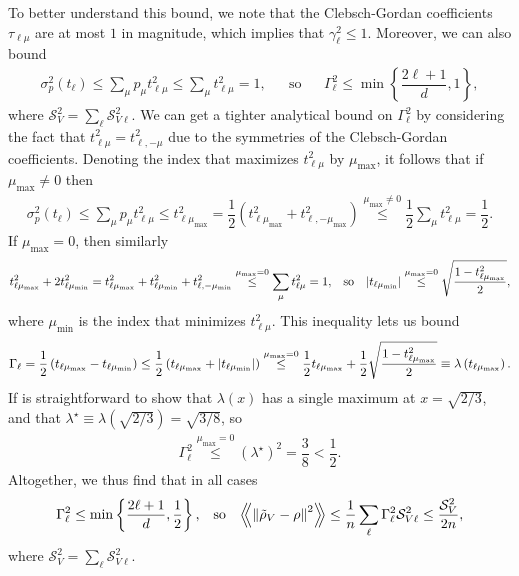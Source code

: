 \documentclass[notitlepage,twocolumn]{revtex4-2}
\renewcommand{\t}{\text} %
\newcommand{\f}[2]{\dfrac{#1}{#2}} %
\newcommand{\p}[1]{\left(#1\right)} %
\renewcommand{\Set}[1]{\left\{#1\right\}} %
\newcommand{\Bbk}[1]
{\left\langle\!\!\left\langle #1 \right\rangle\!\!\right\rangle}
\renewcommand{\S}{\mathcal{S}}
\begin{document}
To better understand this bound, we note that the Clebsch-Gordan coefficients $\tau_{\ell\mu}$ are at most $1$ in magnitude, which implies that $\gamma_\ell^2\le 1$.
Moreover, we can also bound
\begin{align}
  \sigma_p^2\p{t_\ell} \le \sum_\mu p_\mu t_{\ell\mu}^2
  \le \sum_\mu t_{\ell\mu}^2 = 1,
  &&
  \t{so}
  &&
  \Gamma_\ell^2 \le \min\Set{\f{2\ell+1}{d}, 1},
\end{align}
where $\S_V^2=\sum_\ell\S_{V\ell}^2$.
We can get a tighter analytical bound on $\Gamma_\ell^2$ by considering the fact that $t_{\ell\mu}^2 = t_{\ell,-\mu}^2$ due to the symmetries of the Clebsch-Gordan coefficients.
Denoting the index that maximizes $t_{\ell\mu}^2$ by $\mu_{\t{max}}$, it follows that if $\mu_{\t{max}}\ne0$ then
\begin{align}
  \sigma_p^2\p{t_\ell} \le \sum_\mu p_\mu t_{\ell\mu}^2
  \le t_{\ell\mu_{\t{max}}}^2
  = \f12 \p{t_{\ell\mu_{\t{max}}}^2 + t_{\ell,-\mu_{\t{max}}}^2}
  \stackrel{\mu_{\t{max}}\ne0}{\le} \f12 \sum_\mu t_{\ell\mu}^2
  = \f12.
\end{align}
If $\mu_{\t{max}}=0$, then similarly
\begin{align}
  t_{\ell\mu_{\t{max}}}^2 + 2 t_{\ell\mu_{\t{min}}}^2
  = t_{\ell\mu_{\t{max}}}^2 + t_{\ell\mu_{\t{min}}}^2
  + t_{\ell,-\mu_{\t{min}}}^2
  \stackrel{\mu_{\t{max}}=0}{\le}
  \sum_\mu t_{\ell\mu}^2 = 1,
  &&
  \t{so}
  &&
  \abs{t_{\ell\mu_{\t{min}}}}
  \stackrel{\mu_{\t{max}}=0}{\le}
  \sqrt{\f{1 - t_{\ell\mu_{\t{max}}}^2}{2}},
\end{align}
where $\mu_{\t{min}}$ is the index that minimizes $t_{\ell\mu}^2$.
This inequality lets us bound
\begin{align}
  \Gamma_\ell
  = \f12 \p{t_{\ell\mu_{\t{max}}} - t_{\ell\mu_{\t{min}}}}
  \le \f12 \p{t_{\ell\mu_{\t{max}}} + \abs{t_{\ell\mu_{\t{min}}}}}
  \stackrel{\mu_{\t{max}}=0}{\le}
  \f12 t_{\ell\mu_{\t{max}}}
  + \f12\sqrt{\f{1 - t_{\ell\mu_{\t{max}}}^2}{2}}
  \equiv \lambda\p{t_{\ell\mu_{\t{max}}}}.
\end{align}
If is straightforward to show that $\lambda\p{x}$ has a single maximum at $x=\sqrt{2/3}$, and that $\lambda^\star\equiv \lambda\p{\sqrt{2/3}}=\sqrt{3/8}$, so
\begin{align}
  \Gamma_\ell^2
  \stackrel{\mu_{\t{max}}=0}{\le} \p{\lambda^\star}^2
  = \f38 < \f12.
\end{align}
Altogether, we thus find that in all cases
\begin{align}
  \Gamma_\ell^2 \le \min\Set{\f{2\ell+1}{d}, \f12},
  &&
  \t{so}
  &&
  \Bbk{\norm{\tilde\rho_V-\rho}^2}
  \le \f1n \sum_\ell \Gamma_\ell^2 \S_{V\ell}^2
  \le \f{\S_V^2}{2n},
\end{align}
where $\S_V^2 = \sum_\ell \S_{V\ell}^2$.
\end{document}
